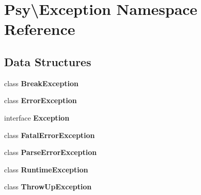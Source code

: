 \section{Psy\textbackslash{}Exception Namespace Reference}
\label{namespace_psy_1_1_exception}
\subsection*{Data Structures}
\begin{DoxyCompactItemize}
\item 
class {\bf Break\+Exception}
\item 
class {\bf Error\+Exception}
\item 
interface {\bf Exception}
\item 
class {\bf Fatal\+Error\+Exception}
\item 
class {\bf Parse\+Error\+Exception}
\item 
class {\bf Runtime\+Exception}
\item 
class {\bf Throw\+Up\+Exception}
\end{DoxyCompactItemize}
